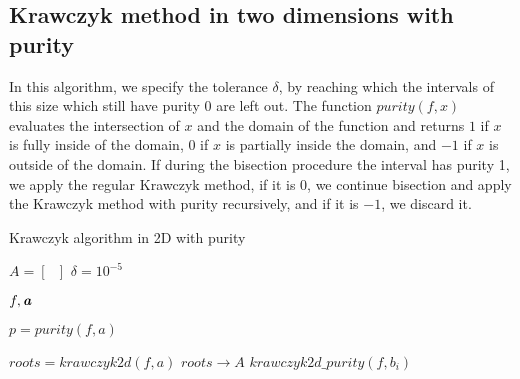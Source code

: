 \documentclass{article}
\begin{document}
\subsection{Krawczyk method in two dimensions with purity}

In this algorithm, we specify the tolerance $\delta$, by reaching which the intervals of this size which still have purity 0 are left out. The function $purity(f, x)$ evaluates the intersection of $x$ and the domain of the function and returns $1$ if $x$ is fully inside of the domain, $0$ if $x$ is partially inside the domain, and $-1$ if $x$ is outside of the domain. If during the bisection procedure the interval has purity 1, we apply the regular Krawczyk method, if it is 0, we continue bisection and apply the Krawczyk method with purity recursively, and if it is $-1$, we discard it.

\begin{algorithm}
\caption{Krawczyk algorithm in 2D with purity}
\label{alg:Krawczyk2Dp}
\begin{algorithmic}
\State $A = [\text{ } ]$ 
\State $\delta = 10^{-5}$


 {$f, \textbf{\emph{a}}$}

\State $p = purity(f, a)$


    
        \State $roots = krawczyk2d(f, a)$
            \State $roots \rightarrow A$
        \EndIf
            \State {}
        \Else
                \State $krawczyk2d\_purity(f, b_i)$
            \EndFor
        \EndIf
          
    
    \EndIf

\EndIf

\EndFunction
\end{algorithmic}
\end{algorithm}
\end{document}

